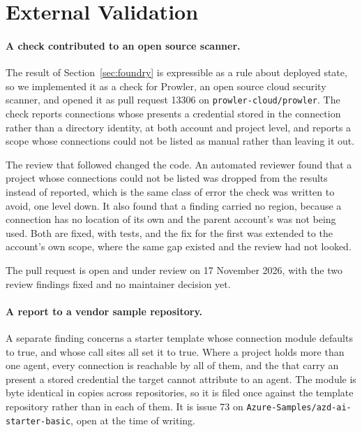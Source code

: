 \section{External Validation}
\label{sec:validation}

\paragraph{A check contributed to an open source scanner.}
The \foundry result of Section~\ref{sec:foundry} is expressible as a rule
about deployed state, so we implemented it as a check for Prowler, an open
source cloud security scanner, and opened it as pull request 13306 on
\texttt{prowler-cloud/prowler}. The check
reports connections whose  presents a credential stored in the
connection rather than a directory identity, at both account and project
level, and reports a scope whose connections could not be listed as manual
rather than leaving it out.

The review that followed changed the code. An automated reviewer found that a
project whose connections could not be listed was dropped from the results
instead of reported, which is the same class of error the check was written to
avoid, one level down. It also found that a finding carried no region, because
a connection has no location of its own and the parent account's was not being
used. Both are fixed, with tests, and the fix for the first was extended to the
account's own scope, where the same gap existed and the review had not looked.

The pull request is open and under review on 17 November 2026, with the two
review findings fixed and no maintainer decision yet.

\paragraph{A report to a vendor sample repository.}
A separate finding concerns a \foundry starter template whose connection
module defaults  to true, and whose \nFoundryTemplateShared
call sites all set it to true. Where a project holds more than one agent,
every connection is reachable by all of them, and the
\nFoundryTemplateApiKey that carry an  present a stored
credential the target cannot attribute to an agent. The
module is byte identical in \nFoundryTemplateCopies copies across
\nFoundryTemplateRepos repositories, so it is filed once against the
template repository rather than in each of them. It is issue 73 on
\texttt{Azure-Samples/\allowbreak azd-ai-starter-basic}, open at the time of
writing.

